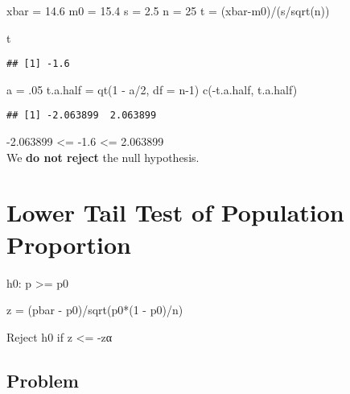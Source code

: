 \documentclass[
]{article}
\newenvironment{Shaded}{\begin{snugshade}}{\end{snugshade}}
\newcommand{\AttributeTok}[1]{\textcolor[rgb]{0.77,0.63,0.00}{#1}}
\newcommand{\DecValTok}[1]{\textcolor[rgb]{0.00,0.00,0.81}{#1}}
\newcommand{\FloatTok}[1]{\textcolor[rgb]{0.00,0.00,0.81}{#1}}
\newcommand{\FunctionTok}[1]{\textcolor[rgb]{0.00,0.00,0.00}{#1}}
\newcommand{\NormalTok}[1]{#1}
\newcommand{\OtherTok}[1]{\textcolor[rgb]{0.56,0.35,0.01}{#1}}
\newcommand{\SpecialCharTok}[1]{\textcolor[rgb]{0.00,0.00,0.00}{#1}}
\begin{document}
\begin{Shaded}
\begin{Highlighting}[]
\NormalTok{xbar }\OtherTok{=} \FloatTok{14.6}
\NormalTok{m0 }\OtherTok{=} \FloatTok{15.4}
\NormalTok{s }\OtherTok{=} \FloatTok{2.5}
\NormalTok{n }\OtherTok{=} \DecValTok{25}
\NormalTok{t }\OtherTok{=}\NormalTok{ (xbar}\SpecialCharTok{{-}}\NormalTok{m0)}\SpecialCharTok{/}\NormalTok{(s}\SpecialCharTok{/}\FunctionTok{sqrt}\NormalTok{(n))}

\NormalTok{t}
\end{Highlighting}
\end{Shaded}

\begin{verbatim}
## [1] -1.6
\end{verbatim}

\begin{Shaded}
\begin{Highlighting}[]
\NormalTok{a }\OtherTok{=}\NormalTok{ .}\DecValTok{05}
\NormalTok{t.a.half }\OtherTok{=} \FunctionTok{qt}\NormalTok{(}\DecValTok{1} \SpecialCharTok{{-}}\NormalTok{ a}\SpecialCharTok{/}\DecValTok{2}\NormalTok{, }\AttributeTok{df =}\NormalTok{ n}\DecValTok{{-}1}\NormalTok{)}
\FunctionTok{c}\NormalTok{(}\SpecialCharTok{{-}}\NormalTok{t.a.half, t.a.half)}
\end{Highlighting}
\end{Shaded}

\begin{verbatim}
## [1] -2.063899  2.063899
\end{verbatim}

-2.063899 \textless= -1.6 \textless= 2.063899\\
We \textbf{do not reject} the null hypothesis.

\hypertarget{lower-tail-test-of-population-proportion}{%
\section{Lower Tail Test of Population
Proportion}\label{lower-tail-test-of-population-proportion}}

h0: p \textgreater= p0

z = (pbar - p0)/sqrt(p0*(1 - p0)/n)

Reject h0 if z \textless= -zα

\hypertarget{problem-16}{%
\subsection{Problem}\label{problem-16}}
\end{document}
